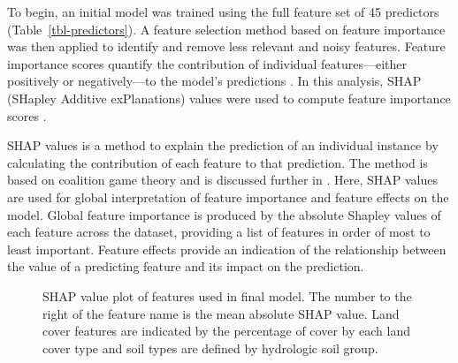 \documentclass[
  authoryear,
  preprint,
  1p,
  onecolumn]{elsarticle}
\begin{document}
To begin, an initial model was trained using the full feature set of 45
predictors (Table~\ref{tbl-predictors}). A feature selection method
based on feature importance was then applied to identify and remove less
relevant and noisy features. Feature importance scores quantify the
contribution of individual features---either positively or
negatively---to the model's predictions \citep{ML_interpretability2019}.
In this analysis, SHAP (SHapley Additive exPlanations) values were used
to compute feature importance scores \citep{SHAP_values}.

SHAP values is a method to explain the prediction of an individual
instance by calculating the contribution of each feature to that
prediction. The method is based on coalition game theory and is
discussed further in \citet{SHAP_values}. Here, SHAP values are used for
global interpretation of feature importance and feature effects on the
model. Global feature importance is produced by the absolute Shapley
values of each feature across the dataset, providing a list of features
in order of most to least important. Feature effects provide an
indication of the relationship between the value of a predicting feature
and its impact on the prediction.

\begin{figure}


\caption{\label{fig-shap_values}SHAP value plot of features used in
final model. The number to the right of the feature name is the mean
absolute SHAP value. Land cover features are indicated by the percentage
of cover by each land cover type and soil types are defined by
hydrologic soil group.}

\end{figure}%
\end{document}
